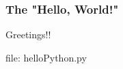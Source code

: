 \begin{frame}[fragile]
\frametitle{The "Hello, World!"}
Greetings!!


file: helloPython.py
\end{frame}